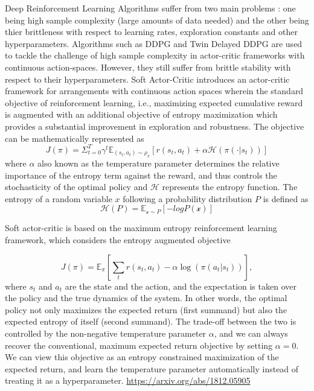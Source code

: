 Deep Reinforcement Learning Algorithms suffer from two main problems : one being high 
sample complexity (large amounts of data needed) and the other being thier brittleness 
with respect to learning rates, exploration constants and other hyperparameters. 
Algorithms such as DDPG and Twin Delayed DDPG are used to tackle the challenge of high 
sample complexity in actor-critic frameworks with continuous action-spaces. However, 
they still suffer from brittle stability with respect to their hyperparameters. Soft 
Actor-Critic introduces an actor-critic framework for arrangements with continuous 
action spaces wherein the standard objective of reinforcement learning, i.e., maximizing 
expected cumulative reward is augmented with an additional objective of entropy 
maximization which provides a substantial improvement in exploration and robustness. 
The objective can be mathematically represented as
$$
J(\pi) = \Sigma_{t=0}^{T}\gamma^t\mathbb{E}_{(s_t, a_t) \sim \rho_{\pi}}[r(s_t, a_t) + \alpha \mathcal{H}(\pi(\cdot \vert s_t))]
$$
where $\alpha$ also known as the temperature parameter determines the relative importance 
of the entropy term against the reward, and thus controls the stochasticity of the optimal 
policy and $\mathcal{H}$ represents the entropy function. The entropy of a random variable 
$x$ following a probability distribution $P$ is defined as
$$
\mathcal{H}(P) = \mathbb{E}_{\mathcal{x} \sim P}[-logP(\mathcal{x})]
$$

Soft actor-critic is based on the maximum entropy reinforcement learning 
framework, which considers the entropy augmented objective

\begin{equation}\label{sac_entropy_augmented_objective}
J(\pi) = \mathbb{E}_\pi\left[
\sum_tr(s_t, a_t) - \alpha \log\left(\pi(a_t | s_t)\right)
\right],
\end{equation}
\noindent{}where $s_t$ and $a_t$ are the state and the action, and the 
expectation is taken over the policy and the true dynamics of the system. 
In other words, the optimal policy not only maximizes the expected return 
(first summand) but also the expected entropy of itself (second summand). 
The trade-off between the two is controlled by the non-negative temperature 
parameter $\alpha$, and we can always recover the conventional, maximum 
expected return objective by setting $\alpha=0$. We can view this objective 
as an entropy constrained maximization of the expected return, and learn 
the temperature parameter automatically instead of treating it as a 
hyperparameter. 
\url{https://arxiv.org/abs/1812.05905}

